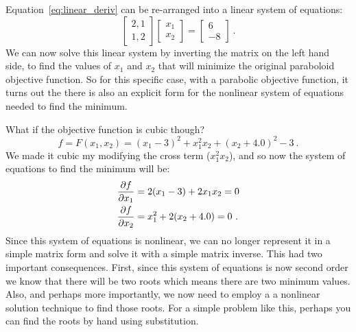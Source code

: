 \documentclass[conf]{new-aiaa}
\begin{document}
    Equation~\eqref{eq:linear_deriv} can be re-arranged into a linear system of equations: 
    \begin{equation}
        \begin{bmatrix}
        2,1 \\
        1,2
        \end{bmatrix} 
        \begin{bmatrix}
        x_1 \\ 
        x_2
        \end{bmatrix} = 
        \begin{bmatrix}
        6 \\ 
        -8
        \end{bmatrix} \ .
    \end{equation}
    We can now solve this linear system by inverting the matrix on the left hand side, to find the values of $x_1$ and $x_2$ that will minimize the original paraboloid objective function.
    So for this specific case, with a parabolic objective function, it turns out the there is also an explicit form for the nonlinear system of equations needed to find the minimum. 

    What if the objective function is cubic though? 
    \begin{equation}
        f = F(x_1,x_2) = (x_1 - 3)^2 + x_1^2 x_2 + (x_2 + 4.0)^2 - 3 \ . 
    \end{equation}
    We made it cubic my modifying the cross term ($x_1^2 x_2$), and so now the system of equations to find the minimum will be: 
    \begin{align}
        \frac{\partial f}{\partial x_1} &= 2(x_1 - 3) + 2 x_1 x_2 = 0 \notag \\
        \frac{\partial f}{\partial x_2} &= x_1^2 + 2(x_2 + 4.0) = 0 \ .
    \end{align}
    Since this system of equations is nonlinear, we can no longer represent it in a simple matrix form and solve it with a simple matrix inverse. 
    This had two important consequences. 
    First, since this system of equations is now second order we know that there will be two roots which means there are two minimum values. 
    Also, and perhaps more importantly, we now need to employ a a nonlinear solution technique to find those roots. 
    For a simple problem like this, perhaps you can find the roots by hand using substitution. 
\end{document}
